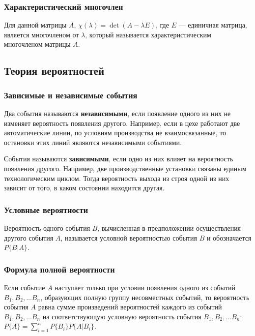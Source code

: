 \documentclass[12pt]{matmex-diploma}
\begin{document}
        \subsubsection*{Характеристический многочлен}
            Для данной матрицы $A$, $\chi (\lambda )=\det(A-\lambda E)$, где $E$ — единичная матрица, является многочленом от $\lambda$, который называется характеристическим многочленом матрицы $A$.
    
    \subsection{Теория вероятностей}
    
        \subsubsection*{Зависимые и независимые события}
            Два события называются \textbf{независимыми}, если появление одного из них не изменяет вероятность появления другого. Например, если в цехе работают две автоматические линии, по условиям производства не взаимосвязанные, то остановки этих линий являются независимыми событиями.
            
            События называются \textbf{зависимыми}, если одно из них влияет на вероятность появления другого. Например, две производственные установки связаны единым технологическим циклом. Тогда вероятность выхода из строя одной из них зависит от того, в каком состоянии находится другая.


        \subsubsection*{Условные вероятности}
            Вероятность одного события $B$, вычисленная в предположении осуществления другого события $A$, называется условной вероятностью события $B$ и обозначается $P\{B|A\}$.
            
        \subsubsection*{Формула полной вероятности}
            Если событие $A$ наступает только при условии появления одного из событий $B_1,B_2,\ldots{B_n}$, образующих полную группу несовместных событий, то вероятность события $A$ равна сумме произведений вероятностей каждого из событий $B_1,B_2,\ldots{B_n}$ на соответствующую условную вероятность события $B_1,B_2,\ldots{B_n}$: $P\{A\}=\sum\limits_{i=1}^{n}P\{B_i\}P\{A|B_i\}$.
\end{document}
